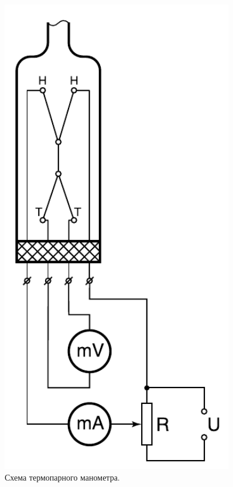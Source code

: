 \documentclass[a4paper, 12pt]{article}
\begin{document}
    \begin{figure}[h]
    \centering
    \begin{minipage}{0.3\textwidth}
        \centering
        \includegraphics[width=0.9\textwidth]{termoparni_monometr}
        \caption{Схема термопарного манометра.}
        \label{ris:termoparni_monometr}
    \end{minipage}\hfill
    \begin{minipage}{0.7\textwidth}

\end{minipage}
\end{figure}
\end{document}
